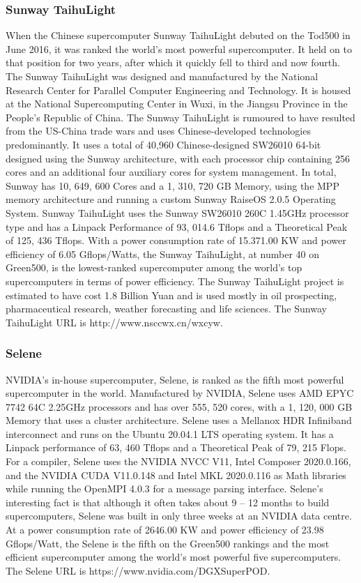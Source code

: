\documentclass{article}
\begin{document}
\subsubsection{Sunway TaihuLight}
When the Chinese supercomputer Sunway TaihuLight debuted on the Tod500 in June 2016, it was ranked the world’s most powerful supercomputer. It held on to that position for two years, after which it quickly fell to third and now fourth. The Sunway TaihuLight was designed and manufactured by the National Research Center for Parallel Computer Engineering and Technology. It is housed at the National Supercomputing Center in Wuxi, in the Jiangsu Province in the People’s Republic of China. The Sunway TaihuLight is rumoured to have resulted from the US-China trade wars and uses Chinese-developed technologies predominantly. It uses a total of 40,960 Chinese-designed SW26010 64-bit designed using the Sunway architecture, with each processor chip containing 256 cores and an additional four auxiliary cores for system management. In total, Sunway has 10, 649, 600 Cores and a 1, 310, 720 GB Memory, using the MPP memory architecture and running a custom Sunway RaiseOS 2.0.5 Operating System. Sunway TaihuLight uses the Sunway SW26010 260C 1.45GHz processor type and has a Linpack Performance of 93, 014.6 Tflops and a Theoretical Peak of 125, 436 Tflops. With a power consumption rate of 15.371.00 KW and power efficiency of 6.05 Gflops/Watts, the Sunway TaihuLight, at number 40 on Green500, is the lowest-ranked supercomputer among the world’s top supercomputers in terms of power efficiency. The Sunway TaihuLight project is estimated to have cost 1.8 Billion Yuan and is used mostly in oil prospecting, pharmaceutical research, weather forecasting and life sciences. The Sunway TaihuLight URL is http://www.nsccwx.cn/wxcyw.

\subsubsection{Selene}
NVIDIA's in-house supercomputer, Selene, is ranked as the fifth most powerful supercomputer in the world. Manufactured by NVIDIA, Selene uses AMD EPYC 7742 64C 2.25GHz processors and has over 555, 520 cores, with a 1, 120, 000 GB Memory that uses a cluster architecture. Selene uses a Mellanox HDR Infiniband interconnect and runs on the Ubuntu 20.04.1 LTS operating system. It has a Linpack performance of 63, 460 Tflops and a Theoretical Peak of 79, 215 Flops. For a compiler, Selene uses the NVIDIA NVCC V11, Intel Composer 2020.0.166, and the NVIDIA CUDA V11.0.148 and Intel MKL 2020.0.116 as Math libraries while running the OpenMPI 4.0.3 for a message parsing interface. Selene's interesting fact is that although it often takes about 9 – 12 months to build supercomputers, Selene was built in only three weeks at an NVIDIA data centre. At a power consumption rate of 2646.00 KW and power efficiency of 23.98 Gflops/Watt, the Selene is the fifth on the Green500 rankings and the most efficient supercomputer among the world's most powerful five supercomputers. The Selene URL is https://www.nvidia.com/DGXSuperPOD. 
\end{document}
